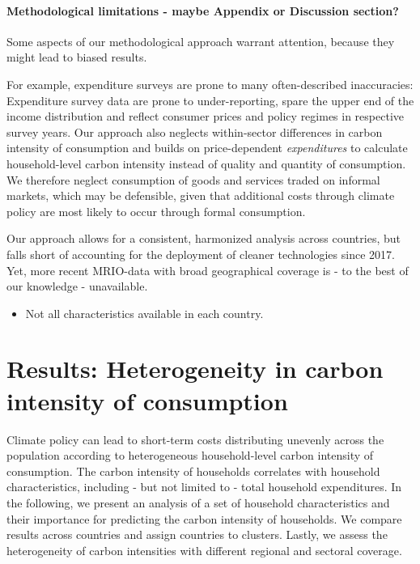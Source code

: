 \documentclass[12pt, a4paper]{article}
\begin{document}
\paragraph{Methodological limitations - maybe Appendix or Discussion section?}

Some aspects of our methodological approach warrant attention, because they might lead to biased results.

For example, expenditure surveys are prone to many often-described inaccuracies: Expenditure survey data are prone to under-reporting, spare the upper end of the income distribution \autocite{Blanchet.2022} and reflect consumer prices and policy regimes in respective survey years. Our approach also neglects within-sector differences in carbon intensity of consumption and builds on price-dependent \textit{expenditures} to calculate household-level carbon intensity instead of quality and quantity of consumption. We therefore neglect consumption of goods and services traded on informal markets, which may be defensible, given that additional costs through climate policy are most likely to occur through formal consumption.

Our approach allows for a consistent, harmonized analysis across countries, but falls short of accounting for the deployment of cleaner technologies since 2017. Yet, more recent MRIO-data with broad geographical coverage is - to the best of our knowledge - unavailable.

\begin{itemize}
    \item Not all characteristics available in each country.
\end{itemize}

\clearpage

\section{Results: Heterogeneity in carbon intensity of consumption} \label{sec:results}

Climate policy can lead to short-term costs distributing unevenly across the population according to heterogeneous household-level carbon intensity of consumption. The carbon intensity of households correlates with household characteristics, including - but not limited to - total household expenditures. In the following, we present an analysis of a set of household characteristics and their importance for predicting the carbon intensity of households. We compare results across countries and assign countries to clusters. Lastly, we assess the heterogeneity of carbon intensities with different regional and sectoral coverage.
\end{document}
